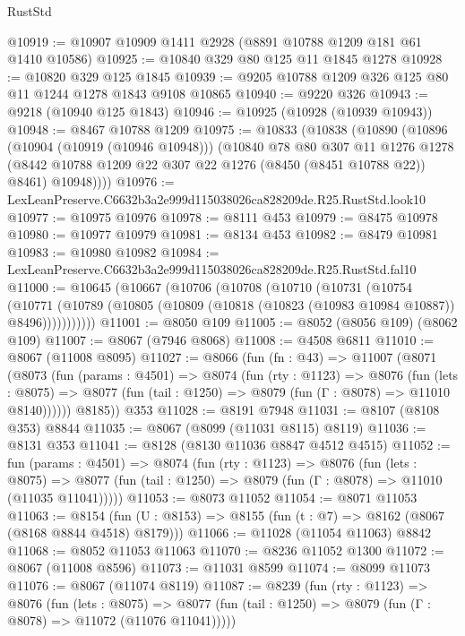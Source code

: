 \begin{lexlean}{RustStd}
\begin{coremodule}
@10919 := @10907 @10909 @1411 @2928 (@8891 @10788 @1209 @181 @61 @1410 @10586)
@10925 := @10840 @329 @80 @125 @11 @1845 @1278
@10928 := @10820 @329 @125 @1845
@10939 := @9205 @10788 @1209 @326 @125 @80 @11 @1244 @1278 @1843 @9108 @10865
@10940 := @9220 @326
@10943 := @9218 (@10940 @125 @1843)
@10946 := @10925 (@10928 (@10939 @10943))
@10948 := @8467 @10788 @1209
@10975 := @10833
    (@10838
      (@10890
        (@10896
          (@10904 (@10919 (@10946 @10948)))
          (@10840
            @78
            @80
            @307
            @11
            @1276
            @1278
            (@8442 @10788 @1209 @22 @307 @22 @1276 (@8450 (@8451 @10788 @22)) @8461)
            @10948))))
@10976 := LexLeanPreserve.C6632b3a2e999d115038026ca828209de.R25.RustStd.look10
@10977 := @10975 @10976
@10978 := @8111 @453
@10979 := @8475 @10978
@10980 := @10977 @10979
@10981 := @8134 @453
@10982 := @8479 @10981
@10983 := @10980 @10982
@10984 := LexLeanPreserve.C6632b3a2e999d115038026ca828209de.R25.RustStd.fal10
@11000 := @10645
    (@10667
      (@10706
        (@10708
          (@10710
            (@10731
              (@10754
                (@10771
                  (@10789 (@10805 (@10809 (@10818 (@10823 (@10983 @10984 @10887)) @8496)))))))))))
@11001 := @8050 @109
@11005 := @8052 (@8056 @109) (@8062 @109)
@11007 := @8067 (@7946 @8068)
@11008 := @4508 @6811
@11010 := @8067 (@11008 @8095)
@11027 := @8066
    (fun (fn : @43) =>
    @11007
      (@8071
        (@8073
          (fun (params : @4501) =>
          @8074
            (fun (rty : @1123) =>
            @8076
              (fun (lets : @8075) =>
              @8077 (fun (tail : @1250) => @8079 (fun (Γ : @8078) => @11010 @8140))))))
        @8185))
    @353
@11028 := @8191 @7948
@11031 := @8107 (@8108 @353) @8844
@11035 := @8067 (@8099 (@11031 @8115) @8119)
@11036 := @8131 @353
@11041 := @8128 (@8130 @11036 @8847 @4512 @4515)
@11052 := fun (params : @4501) =>
  @8074
    (fun (rty : @1123) =>
    @8076
      (fun (lets : @8075) =>
      @8077 (fun (tail : @1250) => @8079 (fun (Γ : @8078) => @11010 (@11035 @11041)))))
@11053 := @8073 @11052
@11054 := @8071 @11053
@11063 := @8154 (fun (U : @8153) => @8155 (fun (t : @7) => @8162 (@8067 (@8168 @8844 @4518) @8179)))
@11066 := @11028 (@11054 @11063) @8842
@11068 := @8052 @11053 @11063
@11070 := @8236 @11052 @1300
@11072 := @8067 (@11008 @8596)
@11073 := @11031 @8599
@11074 := @8099 @11073
@11076 := @8067 (@11074 @8119)
@11087 := @8239
    (fun (rty : @1123) =>
    @8076
      (fun (lets : @8075) =>
      @8077 (fun (tail : @1250) => @8079 (fun (Γ : @8078) => @11072 (@11076 @11041)))))

\end{coremodule}
\end{lexlean}
